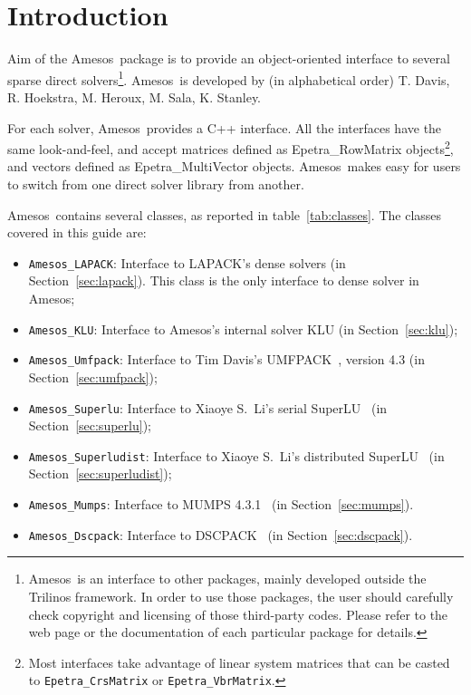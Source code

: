 \documentclass[11pt]{SANDreport}
\newcommand{\amesos}{{\sc Amesos}}
\begin{document}
\section{Introduction}
\label{sec:intro}

Aim of the \amesos\ package is to provide an object-oriented interface to
several sparse direct solvers\footnote{\amesos\ is an interface to other
  packages, mainly developed outside the Trilinos framework. In order to
  use those packages, the user should carefully check copyright and
  licensing of those third-party codes.  Please refer to the web page or
  the documentation of each particular package for details.}. 
\amesos\ is developed by (in alphabetical order) T. Davis, R. Hoekstra,
M. Heroux, M. Sala, K. Stanley.

For each solver, \amesos\ provides a C++ interface. All the interfaces
have the same look-and-feel, and accept matrices defined as
Epetra\_RowMatrix objects\footnote{Most interfaces take advantage of
  linear system matrices that can be casted to {\tt Epetra\_CrsMatrix}
  or {\tt Epetra\_VbrMatrix}.}, and vectors defined as
Epetra\_MultiVector objects. \amesos\ makes easy for users to switch
from one direct solver library from another.

\amesos\ contains several classes, as reported in table~\ref{tab:classes}.
The classes covered in this guide are:
\begin{itemize}
\item \verb!Amesos_LAPACK!: Interface to LAPACK's dense solvers (in
  Section~\ref{sec:lapack}). This class is the only interface to
  dense solver in \amesos;
\item \verb!Amesos_KLU!: Interface to \amesos's internal solver KLU (in
  Section~\ref{sec:klu});
\item \verb!Amesos_Umfpack!: Interface to Tim Davis's
  UMFPACK~\cite{umfpack-home-page}, version 4.3 (in Section~\ref{sec:umfpack});
\item \verb!Amesos_Superlu!: Interface to Xiaoye S.~Li's serial
  SuperLU~\cite{superlu-home-page} (in Section~\ref{sec:superlu});
\item \verb!Amesos_Superludist!: Interface to Xiaoye S.~Li's distributed
  SuperLU~\cite{superlu-home-page} (in Section~\ref{sec:superludist});
\item \verb!Amesos_Mumps!: Interface to MUMPS
  4.3.1~\cite{mumps-home-page} (in Section~\ref{sec:mumps}).
\item \verb!Amesos_Dscpack!: Interface to DSCPACK~\cite{dscpack-manual} 
(in Section~\ref{sec:dscpack}).
\end{itemize}
\end{document}
